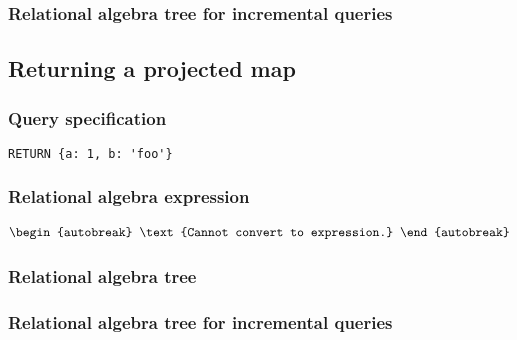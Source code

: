 \subsubsection*{Relational algebra tree for incremental queries}


\subsection{Returning a projected map}

\subsubsection*{Query specification}

\begin{lstlisting}
RETURN {a: 1, b: 'foo'}
\end{lstlisting}

\subsubsection*{Relational algebra expression}

\begin{align*}
\begin{autobreak}
\text{Cannot convert to expression.}
\end{autobreak}
\end{align*}

\subsubsection*{Relational algebra tree}


\subsubsection*{Relational algebra tree for incremental queries}

